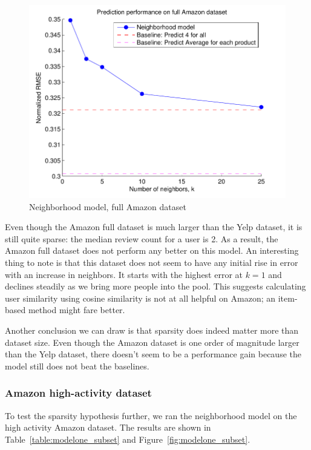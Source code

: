 \documentclass[letterpaper, 11 pt, conference]{ieeeconf}
\begin{document}
\begin{figure}[h]
\includegraphics[scale=0.6]{images/modelone_full.pdf}
\caption{Neighborhood model, full Amazon dataset}
\label{fig:modelone_full}
\end{figure}

Even though the Amazon full dataset is much larger than the Yelp dataset, it 
is still quite sparse: the median review count for a user is 2. As a result, 
the Amazon full dataset does not perform any better on this model. 
An interesting thing to note is that this dataset does not seem to have any 
initial rise in error with an increase in neighbors. It starts with the highest 
error at $k = 1$ and declines steadily as we bring more people into the pool. 
This suggests calculating user similarity using cosine similarity is not at all 
helpful on Amazon; an item-based method might fare better. 

Another conclusion we can draw is that sparsity does indeed matter more than 
dataset size. Even though the Amazon dataset is one order of magnitude larger 
than the Yelp dataset, there doesn't seem to be a performance gain because the 
model still does not beat the baselines. 


\subsubsection{Amazon high-activity dataset}
To test the sparsity hypothesis further, we ran the neighborhood model on the 
high activity Amazon dataset. The results are shown in 
Table~\ref{table:modelone_subset} and Figure~\ref{fig:modelone_subset}.
\end{document}
